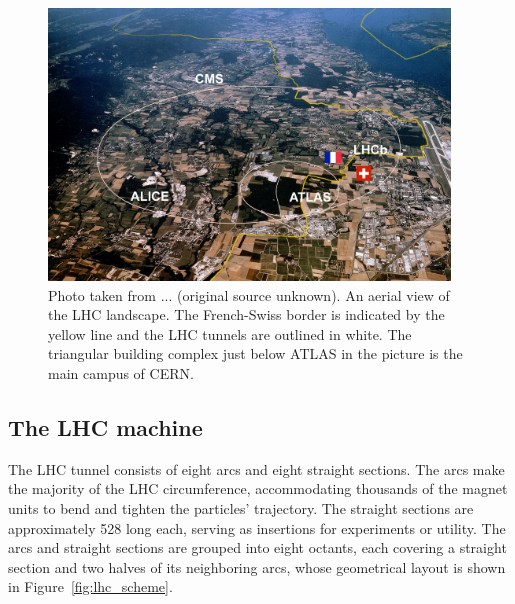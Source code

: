 \begin{figure}[!htb]
    \centering
    \captionsetup{justification=justified}
    \includegraphics[width=0.95\textwidth]{pics/LHC_CMS/LHC_landscape.png}
    \caption{Photo taken from ... (original source unknown). 
             An aerial view of the LHC landscape. The French-Swiss border is indicated by the yellow line and the LHC tunnels are outlined in white.
             The triangular building complex just below ATLAS in the picture is the main campus of CERN.}
    \label{fig:lhc_landscape}
\end{figure}


\subsection{The LHC machine}
The LHC tunnel consists of eight arcs and eight straight sections.
The arcs make the majority of the LHC circumference, accommodating thousands of the magnet units to bend and tighten the particles' trajectory.
The straight sections are approximately 528 \meter long each, serving as insertions for experiments or utility. 
The arcs and straight sections are grouped into eight octants, each covering a straight section and two halves of its neighboring arcs,
whose geometrical layout is shown in Figure~\ref{fig:lhc_scheme}. 

